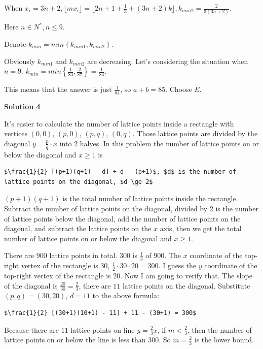 \begin{enumerate}
 When $x_{i} = 3n+2, \lfloor mx_{i} \rfloor = \lfloor 2n+1+\frac{1}{3}+(3n+2)k \rfloor, k_{min2}=\frac{2}{3(3n+2)}.$ 

 Here $n\in N^{*}, n \le 9.$

 Denote $k_{min}=min\left \{k_{min1},k_{min2}  \right \}.$

 Obviously $k_{min1}$ and $k_{min2}$ are decreasing. Let's considering the situation when $n=9.$
$k_{min}=min\left\{\frac{1}{84},\frac{2}{87}\right\}=\frac{1}{84}.$

 This means that the answer is just $\frac{1}{84}$, so $a+b=85$.  Choose $\boxed{E}.$




\textbf{Solution 4}

It's easier to calculate the number of lattice points inside a rectangle with vertices $(0,0)$, $(p,0)$, $(p,q)$, $(0,q)$. Those lattice points are divided by the diagonal $y = \frac{p}{q} \cdot x$ into $2$ halves. In this problem the number of lattice points on or below the diagonal and $x \ge 1$ is

 \begin{verbatim}
$\frac{1}{2} [(p+1)(q+1) - d] + d - (p+1)$, $d$ is the number of lattice points on the diagonal, $d \ge 2$
\end{verbatim}

$(p+1)(q+1)$ is the total number of lattice points inside the rectangle. Subtract the number of lattice points on the diagonal, divided by 2 is the number of lattice points below the diagonal, add the number of lattice points on the diagonal, and subtract the lattice points on the $x$ axis, then we get the total number of lattice points on or below the diagonal and $x \ge 1$.

 There are $900$ lattice points in total. $300$ is $\frac{1}{3}$ of $900$. The $x$ coordinate of the top-right vertex of the rectangle is $30$, $\frac{1}{2} \cdot 30 \cdot 20 = 300$. I guess the $y$ coordinate of the top-right vertex of the rectangle is $20$. Now I am going to verify that.  The slope of the diagonal is $\frac{20}{30} = \frac{2}{3}$, there are $11$ lattice points on the diagonal. Substitute $(p,q)=(30, 20)$, $d=11$ to the above formula:

 \begin{verbatim}
$\frac{1}{2} [(30+1)(10+1) - 11] + 11 - (30+1) = 300$
\end{verbatim}

Because there are $11$ lattice points on line $y = \frac{2}{3}x$, if $m < \frac{2}{3}$, then the number of lattice points on or below the line is less than $300$. So $m = \frac{2}{3}$ is the lower bound.


\end{enumerate}

